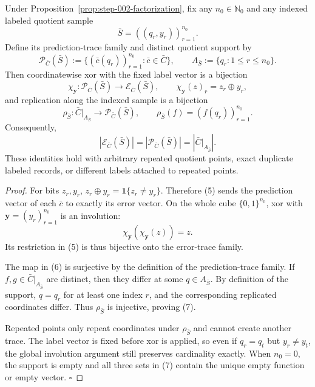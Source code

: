 \begin{proposition}\label{prop:step-005-xor}
Under Proposition~\ref{prop:step-002-factorization}, fix any
\(n_0\in\mathbb N_0\) and any indexed labeled quotient sample
\[
\bar S=((q_r,y_r))_{r=1}^{n_0}.
\]
Define its prediction-trace family and distinct quotient support by
\[
\mathcal P_{\bar C}(\bar S)
:=\{(\bar c(q_r))_{r=1}^{n_0}:\bar c\in\bar C\},
\qquad
A_{\bar S}:=\{q_r:1\le r\le n_0\}.
\tag{4}
\]
Then coordinatewise xor with the fixed label vector is a bijection
\[
\chi_{\mathbf y}:\mathcal P_{\bar C}(\bar S)
\longrightarrow\mathcal E_{\bar C}(\bar S),
\qquad
\chi_{\mathbf y}(z)_r=z_r\oplus y_r,
\tag{5}
\]
and replication along the indexed sample is a bijection
\[
\rho_{\bar S}:\bar C|_{A_{\bar S}}
\longrightarrow\mathcal P_{\bar C}(\bar S),
\qquad
\rho_{\bar S}(f)=(f(q_r))_{r=1}^{n_0}.
\tag{6}
\]
Consequently,
\[
|\mathcal E_{\bar C}(\bar S)|
=|\mathcal P_{\bar C}(\bar S)|
=\left|\bar C|_{A_{\bar S}}\right|.
\tag{7}
\]
These identities hold with arbitrary repeated quotient points, exact
duplicate labeled records, or different labels attached to repeated points.


\end{proposition}

\begin{proof}
For bits \(z_r,y_r\),
\(z_r\oplus y_r=\mathbf 1\{z_r\ne y_r\}\).  Therefore (5) sends the
prediction vector of each \(\bar c\) to exactly its error vector.  On the
whole cube \(\{0,1\}^{n_0}\), xor with \(\mathbf y=(y_r)_{r=1}^{n_0}\) is
an involution:
\[
\chi_{\mathbf y}(\chi_{\mathbf y}(z))=z.
\]
Its restriction in (5) is thus bijective onto the error-trace family.

The map in (6) is surjective by the definition of the prediction-trace
family.  If \(f,g\in\bar C|_{A_{\bar S}}\) are distinct, then they differ at
some \(q\in A_{\bar S}\).  By definition of the support, \(q=q_r\) for at
least one index \(r\), and the corresponding replicated coordinates differ.
Thus \(\rho_{\bar S}\) is injective, proving (7).

Repeated points only repeat coordinates under \(\rho_{\bar S}\) and cannot
create another trace.  The label vector is fixed before xor is applied, so
even if \(q_r=q_t\) but \(y_r\ne y_t\), the global involution argument still
preserves cardinality exactly.  When \(n_0=0\), the support is empty and all
three sets in (7) contain the unique empty function or empty vector.
\(\square\)


\end{proof}

